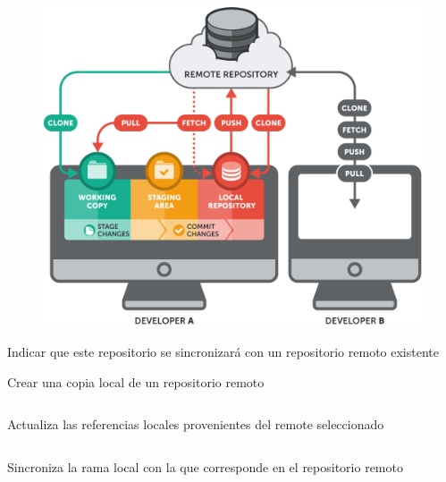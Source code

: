 \documentclass{beamer}
\begin{document}
\begin{frame}
  \begin{figure}
    \centering
    \includegraphics[height=0.8\textheight]{remote}
  \end{figure}
\end{frame}

\begin{frame}
  \begin{center}
    \resizebox{\textwidth}{!}{\FiraTitle \color{green}{Repos Remotos}}
    \vspace{1em}
    
    
    {\FiraTitle Indicar que este repositorio se sincronizará con un repositorio remoto existente}
    \vspace{1em}

    
    {\FiraTitle Crear una copia local de un repositorio remoto}
  \end{center}
\end{frame}

\begin{frame}
  \begin{columns}
    \resizebox{\textwidth}{!}{\FiraTitle \color{purple}{git fetch}}
    {\FiraTitle Actualiza las referencias locales provenientes del remote seleccionado}
  \end{columns}
  
  \vspace{1em}
  
  \begin{columns}
    \resizebox{0.9\textwidth}{!}{\FiraTitle \color{purple}{git pull}}
    {\FiraTitle Sincroniza la rama local con la que corresponde en el repositorio remoto}
  \end{columns}
\end{frame}
\end{document}
